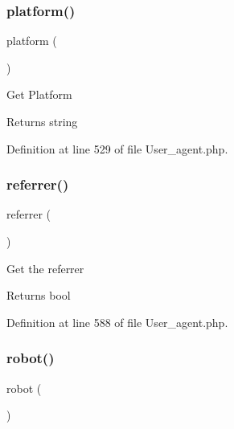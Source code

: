 \mbox{\label{class_c_i___user__agent_ad69bddb2ba31b27415484b3da4213ba8}} 
\subsubsection{\texorpdfstring{platform()}{platform()}}
{\footnotesize\ttfamily platform (\begin{DoxyParamCaption}{ }\end{DoxyParamCaption})}

Get Platform

\begin{DoxyReturn}{Returns}
string 
\end{DoxyReturn}


Definition at line 529 of file User\+\_\+agent.\+php.

\mbox{\label{class_c_i___user__agent_a3a7bdecfe4516d7ce790734ae1449d29}} 
\subsubsection{\texorpdfstring{referrer()}{referrer()}}
{\footnotesize\ttfamily referrer (\begin{DoxyParamCaption}{ }\end{DoxyParamCaption})}

Get the referrer

\begin{DoxyReturn}{Returns}
bool 
\end{DoxyReturn}


Definition at line 588 of file User\+\_\+agent.\+php.

\mbox{\label{class_c_i___user__agent_a4d6a9230d82ec6fc2fdd6bc57f4da5e5}} 
\subsubsection{\texorpdfstring{robot()}{robot()}}
{\footnotesize\ttfamily robot (\begin{DoxyParamCaption}{ }\end{DoxyParamCaption})}


